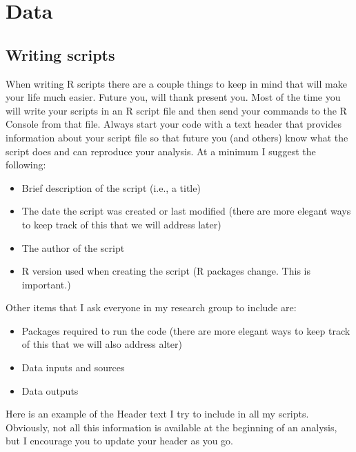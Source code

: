 \documentclass[
]{book}
\providecommand{\tightlist}{%
  \setlength{\itemsep}{0pt}\setlength{\parskip}{0pt}}
\begin{document}
\hypertarget{data}{%
\chapter{Data}\label{data}}

\hypertarget{writing-scripts}{%
\section{Writing scripts}\label{writing-scripts}}

When writing R scripts there are a couple things to keep in mind that will make your life much easier. Future you, will thank present you. Most of the time you will write your scripts in an R script file and then send your commands to the R Console from that file. Always start your code with a text header that provides information about your script file so that future you (and others) know what the script does and can reproduce your analysis. At a minimum I suggest the following:

\begin{itemize}
\tightlist
\item
  Brief description of the script (i.e., a title)
\item
  The date the script was created or last modified (there are more elegant ways to keep track of this that we will address later)
\item
  The author of the script
\item
  R version used when creating the script (R packages change. This is important.)
\end{itemize}

Other items that I ask everyone in my research group to include are:

\begin{itemize}
\tightlist
\item
  Packages required to run the code (there are more elegant ways to keep track of this that we will also address alter)
\item
  Data inputs and sources
\item
  Data outputs
\end{itemize}

Here is an example of the Header text I try to include in all my scripts. Obviously, not all this information is available at the beginning of an analysis, but I encourage you to update your header as you go.
\end{document}
